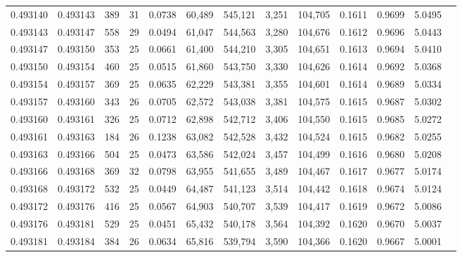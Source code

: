 \begin{tabular}{rrrrrrrrrrrrr}
0.493140 & 0.493143 & 389 &  31 &                                     0.0738 &  60,489 & 545,121 &   3,251 & 104,705 & 0.1611 & 0.9699 & 5.0495 \\
0.493143 & 0.493147 & 558 &  29 &                                     0.0494 &  61,047 & 544,563 &   3,280 & 104,676 & 0.1612 & 0.9696 & 5.0443 \\
0.493147 & 0.493150 & 353 &  25 &                                     0.0661 &  61,400 & 544,210 &   3,305 & 104,651 & 0.1613 & 0.9694 & 5.0410 \\
0.493150 & 0.493154 & 460 &  25 &                                     0.0515 &  61,860 & 543,750 &   3,330 & 104,626 & 0.1614 & 0.9692 & 5.0368 \\
0.493154 & 0.493157 & 369 &  25 &                                     0.0635 &  62,229 & 543,381 &   3,355 & 104,601 & 0.1614 & 0.9689 & 5.0334 \\
0.493157 & 0.493160 & 343 &  26 &                                     0.0705 &  62,572 & 543,038 &   3,381 & 104,575 & 0.1615 & 0.9687 & 5.0302 \\
0.493160 & 0.493161 & 326 &  25 &                                     0.0712 &  62,898 & 542,712 &   3,406 & 104,550 & 0.1615 & 0.9685 & 5.0272 \\
0.493161 & 0.493163 & 184 &  26 &                                     0.1238 &  63,082 & 542,528 &   3,432 & 104,524 & 0.1615 & 0.9682 & 5.0255 \\
0.493163 & 0.493166 & 504 &  25 &                                     0.0473 &  63,586 & 542,024 &   3,457 & 104,499 & 0.1616 & 0.9680 & 5.0208 \\
0.493166 & 0.493168 & 369 &  32 &                                     0.0798 &  63,955 & 541,655 &   3,489 & 104,467 & 0.1617 & 0.9677 & 5.0174 \\
0.493168 & 0.493172 & 532 &  25 &                                     0.0449 &  64,487 & 541,123 &   3,514 & 104,442 & 0.1618 & 0.9674 & 5.0124 \\
0.493172 & 0.493176 & 416 &  25 &                                     0.0567 &  64,903 & 540,707 &   3,539 & 104,417 & 0.1619 & 0.9672 & 5.0086 \\
0.493176 & 0.493181 & 529 &  25 &                                     0.0451 &  65,432 & 540,178 &   3,564 & 104,392 & 0.1620 & 0.9670 & 5.0037 \\
0.493181 & 0.493184 & 384 &  26 &                                     0.0634 &  65,816 & 539,794 &   3,590 & 104,366 & 0.1620 & 0.9667 & 5.0001 \\

\end{tabular}
